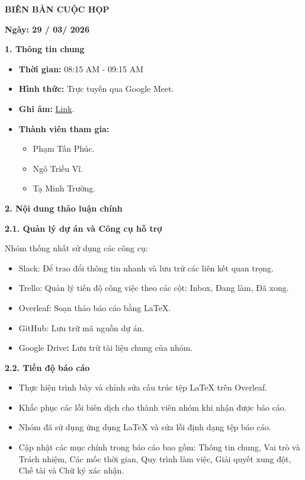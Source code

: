 \documentclass[12pt,a4paper]{article}
\newcommand{\subsecheading}[1]{%
    \par\vspace{2pt}%
    \hspace{1.5em}\textbf{#1}%
    \par\vspace{2pt}%
}
\newcommand{\introtext}[1]{%
    \par\hspace{3.0em}#1\par%
}
\begin{document}
\begin{center}
    {\large\bfseries BIÊN BẢN CUỘC HỌP}
\end{center}
\begin{center}
    \textbf{Ngày: 29 / 03/ 2026}
\end{center}
\vspace{0.4em}

\textbf{1. Thông tin chung}
\begin{itemize}
    \item \textbf{Thời gian:} 08:15 AM - 09:15 AM
    \item \textbf{Hình thức:} Trực tuyến qua Google Meet.
    \item \textbf{Ghi âm:} \href{https://drive.google.com/drive/folders/1C5ZCEFENvkdMgCJapc1XmjGW759TlHee}{Link}.
    \item \textbf{Thành viên tham gia:}
    \begin{itemize}
        \item Phạm Tấn Phúc.
        \item Ngô Triều Vĩ.
        \item Tạ Minh Trường.
    \end{itemize}
\end{itemize}

\textbf{2. Nội dung thảo luận chính}

\subsecheading{2.1. Quản lý dự án và Công cụ hỗ trợ}
\introtext{Nhóm thống nhất sử dụng các công cụ:}
\begin{itemize}[leftmargin=3.3em]
    \item[o] Slack: Để trao đổi thông tin nhanh và lưu trữ các liên kết quan trọng.
    \item[o] Trello: Quản lý tiến độ công việc theo các cột: Inbox, Đang làm, Đã xong.
    \item[o] Overleaf: Soạn thảo báo cáo bằng LaTeX.
    \item[o] GitHub: Lưu trữ mã nguồn dự án.
    \item[o] Google Drive\textbf{:} Lưu trữ tài liệu chung của nhóm.
\end{itemize}

\subsecheading{2.2. Tiến độ báo cáo}
\begin{itemize}
    \item Thực hiện trình bày và chỉnh sửa cấu trúc tệp LaTeX trên Overleaf.
    \item Khắc phục các lỗi biên dịch cho thành viên nhóm khi nhận được báo cáo.
    \item Nhóm đã sử dụng ứng dụng LaTeX và sửa lỗi định dạng tệp báo cáo.
    \item Cập nhật các mục chính trong báo cáo bao gồm: Thông tin chung, Vai trò
          và Trách nhiệm, Các mốc thời gian, Quy trình làm việc, Giải quyết xung đột,
          Chế tài và Chữ ký xác nhận.
\end{itemize}
\end{document}
